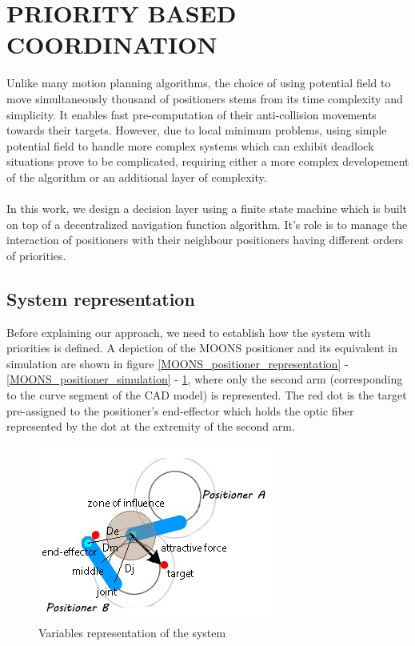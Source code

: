 \documentclass[]{spie}  %
\begin{document}
	\section{PRIORITY BASED COORDINATION}
	\label{PRIORITY BASED COORDINATION}
	
	
	Unlike many motion planning algorithms, the choice of using potential field to move simultaneously thousand of positioners stems from its time complexity and simplicity. It enables fast pre-computation of their anti-collision movements towards their targets. However, due to local minimum problems, using simple potential field to handle more complex systems which can exhibit deadlock situations prove to be complicated, requiring either a more complex developement of the algorithm or an additional layer of complexity.\\\\
	In this work, we design a decision layer using a finite state machine which is built on top of a decentralized navigation function algorithm. It's role is to manage the interaction of positioners with their neighbour positioners having different orders of priorities. 

	\subsection{System representation}	
		\label{Finite-state machine} 
	
	Before explaining our approach, we need to establish how the system with priorities is defined. 
	 A depiction of the MOONS positioner and its equivalent in simulation are shown in figure \ref{MOONS_positioner_representation} - \ref{MOONS_positioner_simulation} - \ref{sys_representation}, where only the second arm (corresponding to the curve segment of the CAD model) is represented. The red dot is the target pre-assigned to the positioner's end-effector which holds the optic fiber represented by the dot at the extremity of the second arm.
		\begin{figure}[H]
			\centering
			\includegraphics[scale=0.56]{images/system_representation.jpg}
			\caption{Variables representation of the system}
			\label{sys_representation}
		\end{figure}
	
\end{document}
